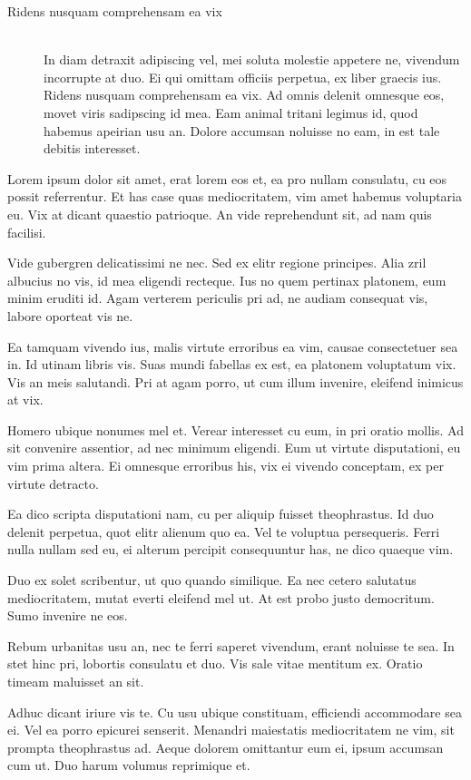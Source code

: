 \begin{description}
		\item[Ridens nusquam comprehensam ea vix] \hfill \\
			In diam detraxit adipiscing vel, mei soluta molestie appetere ne, vivendum incorrupte at duo. Ei qui omittam officiis perpetua, ex liber graecis ius. Ridens nusquam comprehensam ea vix. Ad omnis delenit omnesque eos, movet viris sadipscing id mea. Eam animal tritani legimus id, quod habemus apeirian usu an. Dolore accumsan noluisse no eam, in est tale debitis interesset.
	\end{description}

	Lorem ipsum dolor sit amet, erat lorem eos et, ea pro nullam consulatu, cu eos possit referrentur. Et has case quas mediocritatem, vim amet habemus voluptaria eu. Vix at dicant quaestio patrioque. An vide reprehendunt sit, ad nam quis facilisi.

	Vide gubergren delicatissimi ne nec. Sed ex elitr regione principes. Alia zril albucius no vis, id mea eligendi recteque. Ius no quem pertinax platonem, eum minim eruditi id. Agam verterem periculis pri ad, ne audiam consequat vis, labore oporteat vis ne.

	Ea tamquam vivendo ius, malis virtute erroribus ea vim, causae consectetuer sea in. Id utinam libris vis. Suas mundi fabellas ex est, ea platonem voluptatum vix. Vis an meis salutandi. Pri at agam porro, ut cum illum invenire, eleifend inimicus at vix.

	Homero ubique nonumes mel et. Verear interesset cu eum, in pri oratio mollis. Ad sit convenire assentior, ad nec minimum eligendi. Eum ut virtute disputationi, eu vim prima altera. Ei omnesque erroribus his, vix ei vivendo conceptam, ex per virtute detracto.

	Ea dico scripta disputationi nam, cu per aliquip fuisset theophrastus. Id duo delenit perpetua, quot elitr alienum quo ea. Vel te voluptua persequeris. Ferri nulla nullam sed eu, ei alterum percipit consequuntur has, ne dico quaeque vim.

	Duo ex solet scribentur, ut quo quando similique. Ea nec cetero salutatus mediocritatem, mutat everti eleifend mel ut. At est probo justo democritum. Sumo invenire ne eos.

	Rebum urbanitas usu an, nec te ferri saperet vivendum, erant noluisse te sea. In stet hinc pri, lobortis consulatu et duo. Vis sale vitae mentitum ex. Oratio timeam maluisset an sit.

	Adhuc dicant iriure vis te. Cu usu ubique constituam, efficiendi accommodare sea ei. Vel ea porro epicurei senserit. Menandri maiestatis mediocritatem ne vim, sit prompta theophrastus ad. Aeque dolorem omittantur eum ei, ipsum accumsan cum ut. Duo harum volumus reprimique et.

